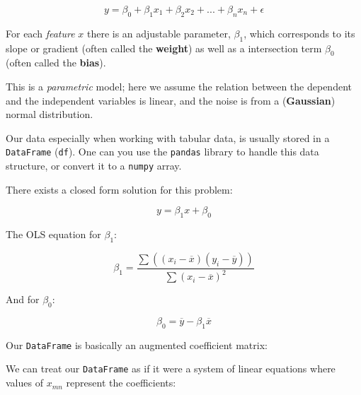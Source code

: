 $$
	y = \beta_0 + \beta_1 x_1 + \beta_2 x_2 + ... + \beta_n x_n + \epsilon
$$

\par
For each \textit{feature} $x$ there is an adjustable parameter, $\beta_1$,
which corresponds to its slope or gradient (often called the \textbf{weight})
as well as a intersection term $\beta_0$ (often called the \textbf{bias}).

\par
This is a \textit{parametric} model; here we assume the relation between the
dependent and the independent variables is linear, and the noise is from a
(\textbf{Gaussian}) normal distribution.

\par
Our data especially when working with tabular data, is usually stored in a
\texttt{DataFrame} (\texttt{df}). One can you use the \texttt{pandas} library to
handle this data structure, or convert it to a \texttt{numpy} array.

\par
There exists a closed form solution for this problem:

$$
	y = \beta_1x+\beta_0
$$

The OLS equation for $\beta_1$:

$$
	\beta_1 = \frac{
		\sum((x_i - \overline{x})(y_i - \overline{y}))}{
		\sum(x_i - \overline{x})^2
	}
$$

And for $\beta_0$:

$$
	\beta_0 = \overline{y} - \beta_1 \overline{x}
$$

\par
Our \texttt{DataFrame} is basically an augmented coefficient matrix:


\par
We can treat our \texttt{DataFrame} as if it were a system of linear equations
where values of $x_{mn}$ represent the coefficients:

$$
$$

